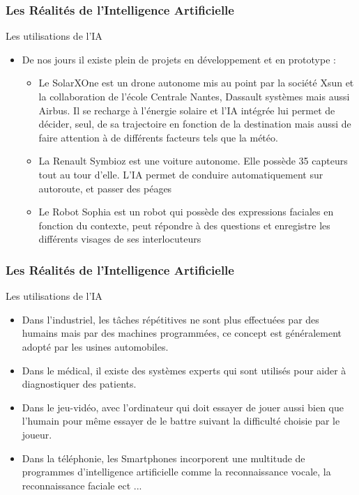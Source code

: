 \documentclass{beamer}
\begin{document}
	\begin{frame}[fragile]
	\frametitle{Les Réalités de l'Intelligence Artificielle}
	\begin{block}{Les utilisations de l'IA}
	\begin{itemize}
	\itemsep1em
		\item De nos jours il existe plein de projets en développement et en prototype :
		\begin{itemize}
		\itemsep1em
		\item Le SolarXOne est un drone autonome mis au point par la société Xsun et la collaboration de l’école Centrale Nantes, Dassault systèmes mais aussi Airbus. Il se recharge à l'énergie solaire et l'IA intégrée lui permet de décider, seul, de sa trajectoire en fonction de la destination mais aussi de faire attention à de différents facteurs tels que la météo.
		\item La Renault Symbioz est une voiture autonome. Elle possède 35 capteurs tout au tour d'elle. L'IA permet de conduire automatiquement sur autoroute, et passer des péages
		\item Le Robot Sophia est un robot qui possède des expressions faciales en fonction du contexte, peut répondre à des questions et enregistre les différents visages de ses interlocuteurs
		\end{itemize}
		\end{itemize}
	\end{block}
	\end{frame}
	
	\begin{frame}[fragile]
	\frametitle{Les Réalités de l'Intelligence Artificielle}
	\begin{block}{Les utilisations de l'IA}
	\begin{itemize}
	\itemsep1em
		\item Dans l'industriel, les tâches répétitives ne sont plus effectuées par des humains mais par des machines programmées, ce concept est généralement adopté par les usines automobiles.
		\item Dans le médical, il existe des systèmes experts qui sont utilisés pour aider à diagnostiquer des patients.
		\item Dans le jeu-vidéo, avec l'ordinateur qui doit essayer de jouer aussi bien que l'humain pour même essayer de le battre suivant la difficulté choisie par le joueur.
		\item Dans la téléphonie, les Smartphones incorporent une multitude de programmes d'intelligence artificielle comme la reconnaissance vocale, la reconnaissance faciale ect ...
	\end{itemize}
	\end{block}
	\end{frame}
	
\end{document}
